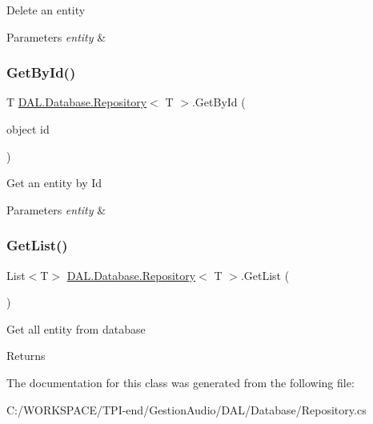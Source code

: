 Delete an entity 


\begin{DoxyParams}{Parameters}
{\em entity} & \\
\hline
\end{DoxyParams}
\mbox{\label{class_d_a_l_1_1_database_1_1_repository_abee9e993465bcb13da296143fe8b5c3e}} 
\subsubsection{\texorpdfstring{Get\+By\+Id()}{GetById()}}
{\footnotesize\ttfamily T \hyperlink{class_d_a_l_1_1_database_1_1_repository}{D\+A\+L.\+Database.\+Repository}$<$ T $>$.Get\+By\+Id (\begin{DoxyParamCaption}\item[{object}]{id }\end{DoxyParamCaption})}



Get an entity by Id 


\begin{DoxyParams}{Parameters}
{\em entity} & \\
\hline
\end{DoxyParams}
\mbox{\label{class_d_a_l_1_1_database_1_1_repository_aad0464a6d5b228ea60b3dbb281569e21}} 
\subsubsection{\texorpdfstring{Get\+List()}{GetList()}}
{\footnotesize\ttfamily List$<$T$>$ \hyperlink{class_d_a_l_1_1_database_1_1_repository}{D\+A\+L.\+Database.\+Repository}$<$ T $>$.Get\+List (\begin{DoxyParamCaption}{ }\end{DoxyParamCaption})}



Get all entity from database 

\begin{DoxyReturn}{Returns}

\end{DoxyReturn}


The documentation for this class was generated from the following file\+:\begin{DoxyCompactItemize}
\item 
C\+:/\+W\+O\+R\+K\+S\+P\+A\+C\+E/\+T\+P\+I-\/end/\+Gestion\+Audio/\+D\+A\+L/\+Database/Repository.\+cs\end{DoxyCompactItemize}
